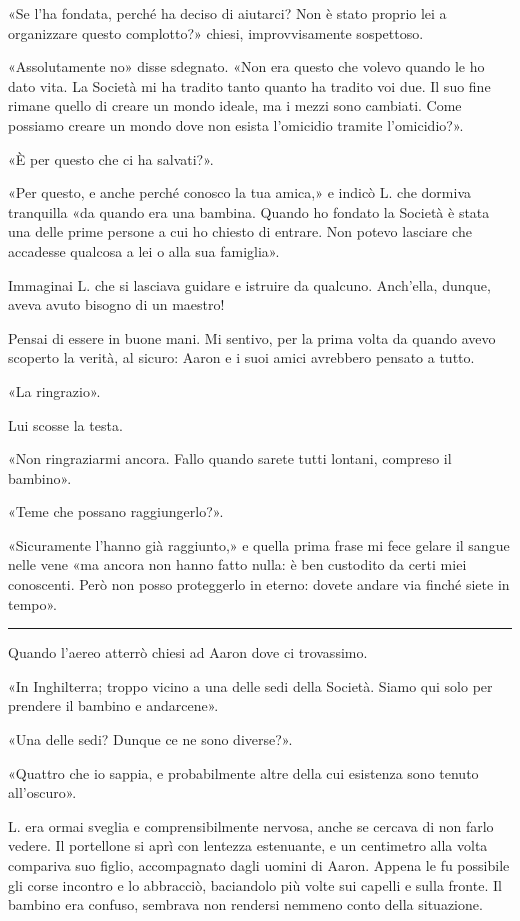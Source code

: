 \documentclass[a4paper,11pt,oneside,openright,final]{memoir}
\begin{document}
«Se l'ha fondata, perché ha deciso di aiutarci? Non è stato proprio lei a
organizzare questo complotto?» chiesi, improvvisamente sospettoso.

«Assolutamente no» disse sdegnato. «Non era questo che volevo quando le ho dato
vita. La Società mi ha tradito tanto quanto ha tradito voi due. Il suo fine
rimane quello di creare un mondo ideale, ma i mezzi sono cambiati. Come possiamo
creare un mondo dove non esista l'omicidio tramite l'omicidio?».

«È per questo che ci ha salvati?».

«Per questo, e anche perché conosco la tua amica,» e indicò L. che dormiva
tranquilla «da quando era una bambina. Quando ho fondato la Società è stata una
delle prime persone a cui ho chiesto di entrare. Non potevo lasciare che
accadesse qualcosa a lei o alla sua famiglia».

Immaginai L. che si lasciava guidare e istruire da qualcuno. Anch'ella, dunque,
aveva avuto bisogno di un maestro!

Pensai di essere in buone mani. Mi sentivo, per la prima volta da quando avevo
scoperto la verità, al sicuro: Aaron e i suoi amici avrebbero pensato a tutto.

«La ringrazio».

Lui scosse la testa.

«Non ringraziarmi ancora. Fallo quando sarete tutti lontani, compreso il
bambino».

«Teme che possano raggiungerlo?».

«Sicuramente l'hanno già raggiunto,» e quella prima frase mi fece gelare il
sangue nelle vene «ma ancora non hanno fatto nulla: è ben custodito da certi
miei conoscenti. Però non posso proteggerlo in eterno: dovete andare via finché
siete in tempo».

\plainbreak{1}

Quando l'aereo atterrò chiesi ad Aaron dove ci trovassimo.

«In Inghilterra; troppo vicino a una delle sedi della Società. Siamo qui solo
per prendere il bambino e andarcene».

«Una delle sedi? Dunque ce ne sono diverse?».

«Quattro che io sappia, e probabilmente altre della cui esistenza sono tenuto
all'oscuro».

L. era ormai sveglia e comprensibilmente nervosa, anche se cercava di non farlo
vedere. Il portellone si aprì con lentezza estenuante, e un centimetro alla
volta compariva suo figlio, accompagnato dagli uomini di Aaron. Appena le fu
possibile gli corse incontro e lo abbracciò, baciandolo più volte sui capelli e
sulla fronte. Il bambino era confuso, sembrava non rendersi nemmeno conto della
situazione.
\end{document}
